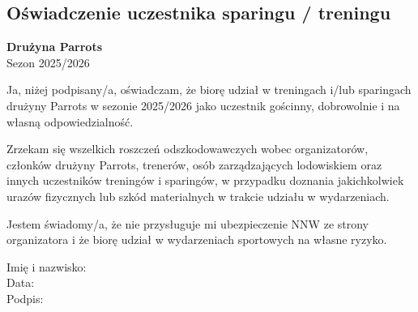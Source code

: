 \documentclass[12pt,a4paper]{article}
\begin{document}
\begin{center}
\section*{Oświadczenie uczestnika sparingu / treningu}
\textbf{Drużyna Parrots}\\
Sezon 2025/2026
\end{center}

\vspace{1em}

Ja, niżej podpisany/a, oświadczam, że biorę udział w treningach i/lub sparingach drużyny Parrots w sezonie 2025/2026 jako uczestnik gościnny, dobrowolnie i na własną odpowiedzialność.

\bigskip

Zrzekam się wszelkich roszczeń odszkodowawczych wobec organizatorów, członków drużyny Parrots, trenerów, osób zarządzających lodowiskiem oraz innych uczestników treningów i sparingów, w przypadku doznania jakichkolwiek urazów fizycznych lub szkód materialnych w trakcie udziału w wydarzeniach.

\bigskip

Jestem świadomy/a, że nie przysługuje mi ubezpieczenie NNW ze strony organizatora i że biorę udział w wydarzeniach sportowych na własne ryzyko.

\vspace{2em}

\noindent Imię i nazwisko: \dotfill \\[2em]
Data: \dotfill \\[2em]
Podpis: \dotfill
\end{document}
